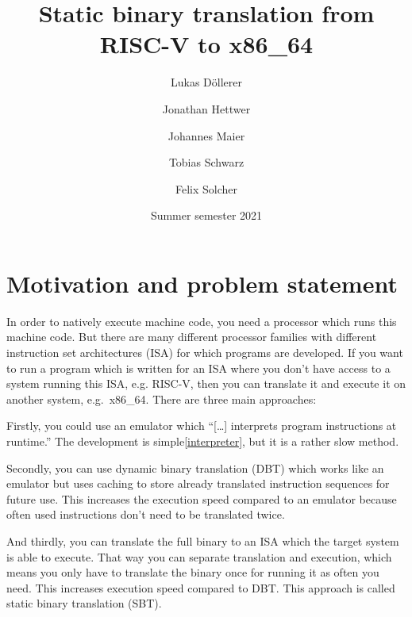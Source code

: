 \documentclass[course=eragp]{aspdoc}
\author{Lukas Döllerer \and Jonathan Hettwer \and Johannes Maier \and Tobias Schwarz \and Felix Solcher}
\date{Summer semester 2021}
\title{Static binary translation from RISC-V to x86\_64}
\begin{document}
\maketitle

\tableofcontents

\pagebreak

\section{Motivation and problem statement}


In order to natively execute machine code, you need a processor which runs this machine code. But there are
many different processor families with different instruction set architectures (ISA) for which programs are
developed. If you want to run a program which is written for an ISA where you don't have access to a
system running this ISA, e.g. RISC-V, then you can translate it and execute it on another system,
e.g.\ x86\_64. There are three main approaches:

\par

Firstly, you could use an emulator which ``[\ldots] interprets program instructions at
runtime.''\cite{binary_translation} The development is simple\ref{interpreter}, but it is a rather slow method.

\par

Secondly, you can use dynamic binary translation (DBT) which works like an emulator but uses caching
to store already translated instruction sequences for future use. This increases the execution speed
compared to an emulator because often used instructions don't need to be translated
twice.\cite{binary_translation}

\par

And thirdly, you can translate the full binary to an ISA which the target system is able to execute.
That way you can separate translation and execution, which means you only have to translate the
binary once for running it as often you need. This increases execution speed compared to DBT. This
approach is called static binary translation (SBT).\cite{binary_translation}
\end{document}
